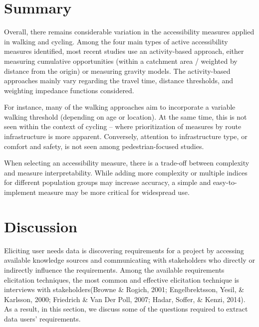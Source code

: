 \documentclass[
11pt, %
oneside, %
english, %
singlespacing, %
]{macthesis} %
\begin{document}
\section{Summary}\label{summary}

Overall, there remains considerable variation in the accessibility measures applied in walking and cycling. Among the four main types of active accessibility measures identified, most recent studies use an activity-based approach, either measuring cumulative opportunities (within a catchment area / weighted by distance from the origin) or measuring gravity models. The activity-based approaches mainly vary regarding the travel time, distance thresholds, and weighting impedance functions considered.

For instance, many of the walking approaches aim to incorporate a variable walking threshold (depending on age or location). At the same time, this is not seen within the context of cycling -- where prioritization of measures by route infrastructure is more apparent. Conversely, attention to infrastructure type, or comfort and safety, is not seen among pedestrian-focused studies.

When selecting an accessibility measure, there is a trade-off between complexity and measure interpretability. While adding more complexity or multiple indices for different population groups may increase accuracy, a simple and easy-to-implement measure may be more critical for widespread use.

\section{Discussion}\label{discussion}

Eliciting user needs data is discovering requirements for a project by accessing available knowledge sources and communicating with stakeholders who directly or indirectly influence the requirements. Among the available requirements elicitation techniques, the most common and effective elicitation technique is interviews with stakeholders(Browne \& Rogich, 2001; Engelbrektsson, Yesil, \& Karlsson, 2000; Friedrich \& Van Der Poll, 2007; Hadar, Soffer, \& Kenzi, 2014). As a result, in this section, we discuss some of the questions required to extract data users' requirements.
\end{document}
